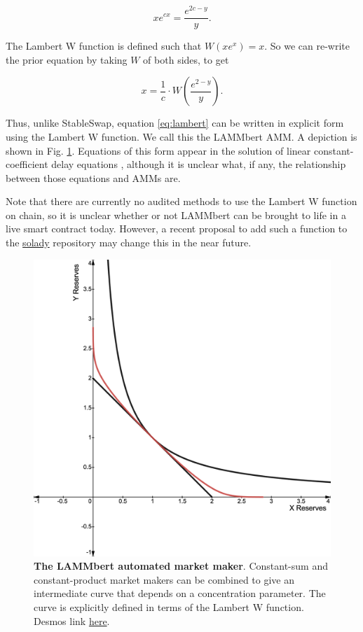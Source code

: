 \documentclass[bibliography=numbered]{article}
\begin{document}
\begin{equation}
\label{eq:lambert}
    xe^{cx}
    = 
    \frac{e^{2c-y}}{y}.
\end{equation}

The Lambert W function is defined such that $W(xe^x) = x$. So we can re-write the prior equation by taking $W$ of both sides, to get

\begin{equation}
\label{eq:lambert-2}
    x
    = 
    \frac{1}{c} \cdot W\left( \frac{e^{2-y}}{y} \right).
\end{equation}

Thus, unlike StableSwap, equation \eqref{eq:lambert} can be written in explicit form using the Lambert W function. We call this the LAMMbert AMM. A depiction is shown in Fig. \ref{fig:lambertw}. Equations of this form appear in the solution of linear constant-coefficient delay equations \cite{corless1996lambert}, although it is unclear what, if any, the relationship between those equations and AMMs are. 

Note that there are currently no audited methods to use the Lambert W function on chain, so it is unclear whether or not LAMMbert can be brought to life in a live smart contract today. However, a recent proposal to add such a function to the \href{https://github.com/Vectorized/solady/pull/706}{solady} repository may change this in the near future.

\begin{figure}
    \centering
    \includegraphics[width=0.5\linewidth]{lambertw.png}
    \caption{\textbf{The LAMMbert automated market maker}. Constant-sum and constant-product market makers can be combined to give an intermediate curve that depends on a concentration parameter. The curve is explicitly defined in terms of the Lambert W function. Desmos link \href{https://www.desmos.com/calculator/9jx4j0rvzm}{here}.}
    \label{fig:lambertw}
\end{figure}

\printbibliography %
\end{document}
